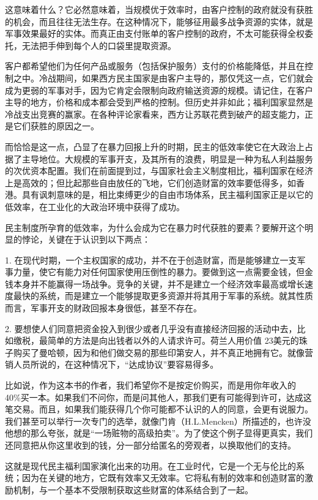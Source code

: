 这意味着什么？它必然意味着，当规模优于效率时，由客户控制的政府就没有获胜的机会，而且往往无法生存。在这种情况下，能够征用最多战争资源的实体，就是军事效果最好的实体。而真正由支付账单的客户控制的政府，不太可能获得全权委托，无法把手伸到每个人的口袋里提取资源。

客户都希望他们为任何产品或服务（包括保护服务）支付的价格能降低，并且在控制之中。冷战期间，如果西方民主国家是由客户主导的，那仅凭这一点，它们就会成为更弱的军事对手，因为它肯定会限制向政府输送资源的规模。请记住，在客户主导的地方，价格和成本都会受到严格的控制。但历史并非如此；福利国家显然是冷战支出竞赛的赢家。在各种评论家看来，西方让苏联花费到破产的超支能力，正是它们获胜的原因之一。

而恰恰是这一点，凸显了在暴力回报上升的时期，民主的低效率使它在大政治上占据了主导地位。大规模的军事开支，及其所有的浪费，明显是一种为私人利益服务的次优资本配置。我们在前面提到过，与国家社会主义制度相比，福利国家在经济上是高效的；但比起那些自由放任的飞地，它们创造财富的效率要低得多，如香港。具有讽刺意味的是，相比束缚更少的自由市场体系，民主福利国家正是以它的低效率，在工业化的大政治环境中获得了成功。

民主制度所孕育的低效率，为什么会成为它在暴力时代获胜的要素？要解开这个明显的悖论，关键在于认识到以下两点：

1. 在现代时期，一个主权国家的成功，并不在于创造财富，而是能够建立一支军事力量，使它有能力对任何国家使用压倒性的暴力。要做到这一点需要金钱，但金钱本身并不能赢得一场战争。竞争的关键，并不是建立一个经济效率最高或增长速度最快的系统，而是建立一个能够提取更多资源并将其用于军事的系统。就其性质而言，军事开支的财政回报本身很低，甚至不存在。

2. 要想使人们同意把资金投入到很少或者几乎没有直接经济回报的活动中去，比如缴税，最简单的方法是向出钱者以外的人请求许可。荷兰人用价值 23美元的珠子购买了曼哈顿，因为和他们做交易的那些印第安人，并不真正地拥有它。就像营销人员所说的，在这种情况下，“达成协议”要容易得多。

比如说，作为这本书的作者，我们希望你不是按定价购买，而是用你年收入的 40\%买一本。如果我们不问你，而是问其他人，那我们更有可能得到许可，达成这笔交易。而且，如果我们能获得几个你可能都不认识的人的同意，会更有说服力。我们甚至可以举行一次专门的选举，就像门肯（H.L.Mencken）所描述的，也许没他想的那么夸张，就是“一场赃物的高级拍卖”。为了使这个例子显得更真实，我们还同意把从你这里收到的钱，分一部分给匿名的旁观者，以换取他们的支持。

这就是现代民主福利国家演化出来的功用。在工业时代，它是一个无与伦比的系统；因为在关键的地方，它既有效率又无效率。它将私有制的效率和创造财富的激励机制，与一个基本不受限制获取这些财富的体系结合到了一起。


